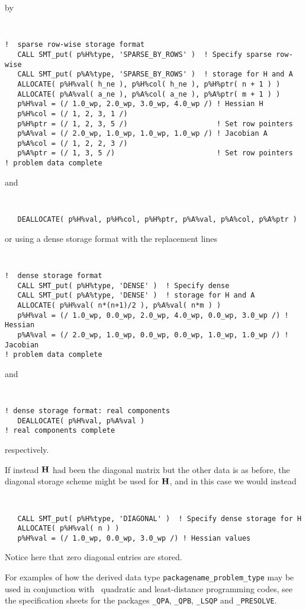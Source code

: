 \documentclass{galahad}
\begin{document}
\noindent
by
{\tt \small
\begin{verbatim}
!  sparse row-wise storage format
   CALL SMT_put( p%H%type, 'SPARSE_BY_ROWS' )  ! Specify sparse row-wise
   CALL SMT_put( p%A%type, 'SPARSE_BY_ROWS' )  ! storage for H and A
   ALLOCATE( p%H%val( h_ne ), p%H%col( h_ne ), p%H%ptr( n + 1 ) )
   ALLOCATE( p%A%val( a_ne ), p%A%col( a_ne ), p%A%ptr( m + 1 ) )
   p%H%val = (/ 1.0_wp, 2.0_wp, 3.0_wp, 4.0_wp /) ! Hessian H
   p%H%col = (/ 1, 2, 3, 1 /)
   p%H%ptr = (/ 1, 2, 3, 5 /)                     ! Set row pointers
   p%A%val = (/ 2.0_wp, 1.0_wp, 1.0_wp, 1.0_wp /) ! Jacobian A
   p%A%col = (/ 1, 2, 2, 3 /)
   p%A%ptr = (/ 1, 3, 5 /)                        ! Set row pointers
! problem data complete
\end{verbatim}
}
\noindent
and
{\tt \small
\begin{verbatim}
   DEALLOCATE( p%H%val, p%H%col, p%H%ptr, p%A%val, p%A%col, p%A%ptr )
\end{verbatim}
}
\noindent
or using a dense storage format with the replacement lines
{\tt \small
\begin{verbatim}
!  dense storage format
   CALL SMT_put( p%H%type, 'DENSE' )  ! Specify dense
   CALL SMT_put( p%A%type, 'DENSE' )  ! storage for H and A
   ALLOCATE( p%H%val( n*(n+1)/2 ), p%A%val( n*m ) )
   p%H%val = (/ 1.0_wp, 0.0_wp, 2.0_wp, 4.0_wp, 0.0_wp, 3.0_wp /) ! Hessian
   p%A%val = (/ 2.0_wp, 1.0_wp, 0.0_wp, 0.0_wp, 1.0_wp, 1.0_wp /) ! Jacobian
! problem data complete
\end{verbatim}
}
\noindent
and
{\tt \small
\begin{verbatim}
! dense storage format: real components
   DEALLOCATE( p%H%val, p%A%val )
! real components complete
\end{verbatim}
}
\noindent
respectively.

If instead ${\mathbf{H}}$ had been the diagonal matrix
but the other data is as before, the diagonal storage scheme
might be used for ${\mathbf{H}}$, and in this case we would instead
{\tt \small
\begin{verbatim}
   CALL SMT_put( p%H%type, 'DIAGONAL' )  ! Specify dense storage for H
   ALLOCATE( p%H%val( n ) )
   p%H%val = (/ 1.0_wp, 0.0_wp, 3.0_wp /) ! Hessian values
\end{verbatim}
}
\noindent
Notice here that zero diagonal entries are stored.

For examples of how the derived data type
{\tt packagename\_problem\_type} may be used in conjunction with
\galahad\ quadratic and least-distance programming codes,
see the specification sheets
for the packages
{\tt \libraryname\_QPA},
{\tt \libraryname\_QPB},
{\tt \libraryname\_LSQP}
and
{\tt \libraryname\_PRESOLVE}.
\end{document}
